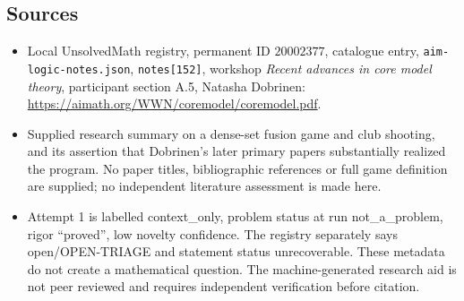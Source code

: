 \documentclass[11pt]{article}
\begin{document}
\subsection{Sources}
\begin{itemize}
\item Local UnsolvedMath registry, permanent ID \(20002377\), catalogue entry, \texttt{aim-logic-notes.json}, \texttt{notes[152]}, workshop \emph{Recent advances in core model theory}, participant section A.5, Natasha Dobrinen: \url{https://aimath.org/WWN/coremodel/coremodel.pdf}.
\item Supplied research summary on a dense-set fusion game and club shooting, and its assertion that Dobrinen's later primary papers substantially realized the program. No paper titles, bibliographic references or full game definition are supplied; no independent literature assessment is made here.
\item Attempt 1 is labelled context\_only, problem status at run not\_a\_problem, rigor ``proved'', low novelty confidence. The registry separately says open/OPEN-TRIAGE and statement status unrecoverable. These metadata do not create a mathematical question. The machine-generated research aid is not peer reviewed and requires independent verification before citation.
\end{itemize}
\end{document}
